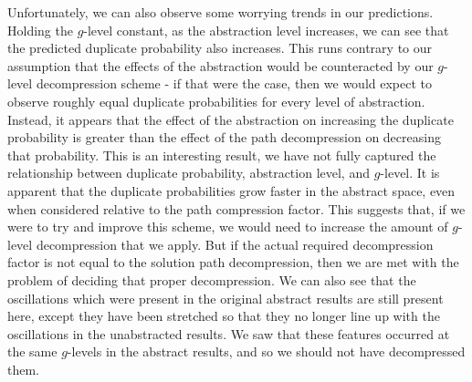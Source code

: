 \documentclass{article}
\begin{document}
Unfortunately, we can also observe some worrying trends in our predictions.
Holding the \(g\)-level constant, as the abstraction level increases,
we can see that the predicted duplicate probability also increases.
This runs contrary to our assumption that the effects of the abstraction
would be counteracted by our \(g\)-level decompression scheme - if that were the case,
then we would expect to observe roughly equal duplicate probabilities for every level of abstraction.
Instead, it appears that the effect of the abstraction on increasing the duplicate probability
is greater than the effect of the path decompression on decreasing that probability.
This is an interesting result, we have not fully captured
the relationship between duplicate probability, abstraction level, and \(g\)-level.
It is apparent that the duplicate probabilities grow faster in the abstract space,
even when considered relative to the path compression factor.
This suggests that, if we were to try and improve this scheme, we would need to increase
the amount of \(g\)-level decompression that we apply.
But if the actual required decompression factor is not equal to the solution path decompression,
then we are met with the problem of deciding that proper decompression.
We can also see that the oscillations which were present in the original abstract results
are still present here, except they have been stretched so that they no longer
line up with the oscillations in the unabstracted results.
We saw that these features occurred at the same \(g\)-levels in the abstract results,
and so we should not have decompressed them. \\
\end{document}
